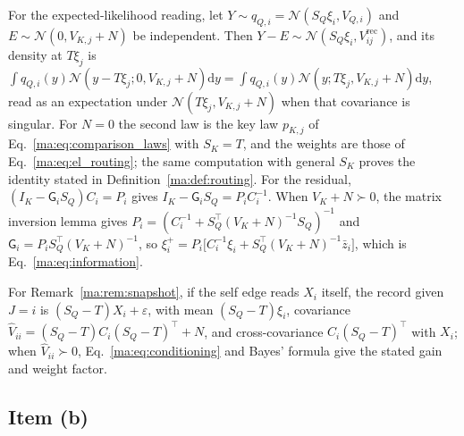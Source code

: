 \documentclass[11pt]{article}
\theoremstyle{definition}
\theoremstyle{remark}
\newcommand{\Gauss}{\mathcal N}
\newcommand{\Vrec}{V^{\mathrm{rec}}}
\newcommand{\G}{\mathsf G}
\begin{document}
For the expected-likelihood reading, let $Y\sim q_{Q,i}=\Gauss(S_Q\xi_i,V_{Q,i})$ and $E\sim\Gauss(0,V_{K,j}+N)$ be independent. Then $Y-E\sim\Gauss(S_Q\xi_i,\Vrec_{ij})$, and its density at $T\xi_j$ is $\int q_{Q,i}(y)\Gauss(y-T\xi_j;0,V_{K,j}+N)\mathrm dy=\int q_{Q,i}(y)\Gauss(y;T\xi_j,V_{K,j}+N)\mathrm dy$, read as an expectation under $\Gauss(T\xi_j,V_{K,j}+N)$ when that covariance is singular. For $N=0$ the second law is the key law $p_{K,j}$ of Eq.~\eqref{ma:eq:comparison_laws} with $S_K=T$, and the weights are those of Eq.~\eqref{ma:eq:el_routing}; the same computation with general $S_K$ proves the identity stated in Definition~\ref{ma:def:routing}. For the residual, $(I_K-\G_iS_Q)C_i=P_i$ gives $I_K-\G_iS_Q=P_iC_i^{-1}$. When $V_K+N\succ0$, the matrix inversion lemma \citep{petersen2012matrix} gives $P_i=(C_i^{-1}+S_Q^\top(V_K+N)^{-1}S_Q)^{-1}$ and $\G_i=P_iS_Q^\top(V_K+N)^{-1}$, so $\xi_i^+=P_i\bigl[C_i^{-1}\xi_i+S_Q^\top(V_K+N)^{-1}\bar z_i\bigr]$, which is Eq.~\eqref{ma:eq:information}.

For Remark~\ref{ma:rem:snapshot}, if the self edge reads $X_i$ itself, the record given $J=i$ is $(S_Q-T)X_i+\varepsilon$, with mean $(S_Q-T)\xi_i$, covariance $\widehat V_{ii}=(S_Q-T)C_i(S_Q-T)^\top+N$, and cross-covariance $C_i(S_Q-T)^\top$ with $X_i$; when $\widehat V_{ii}\succ0$, Eq.~\eqref{ma:eq:conditioning} and Bayes' formula give the stated gain and weight factor.

\subsection{Item (b)}
\label{ma:app:item2}
\end{document}
